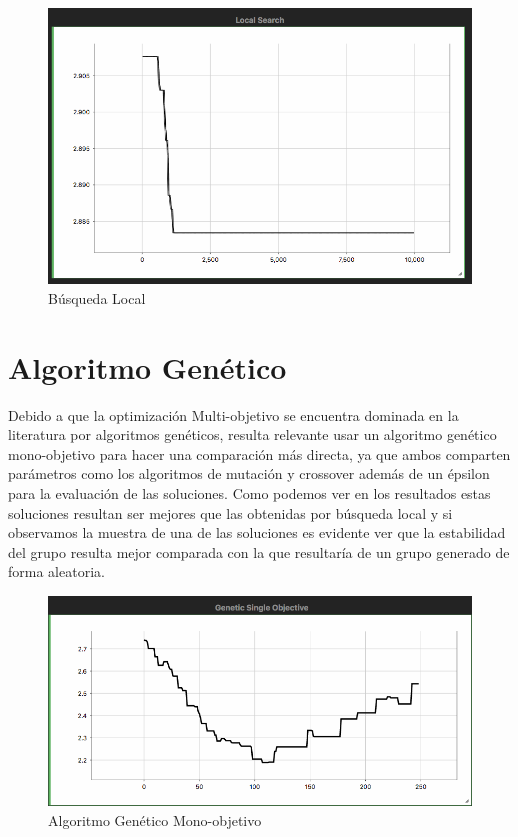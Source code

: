 \begin{figure}
    \centering
    \includegraphics[width=150mm]{Local.png}
    \caption{Búsqueda Local}
    \label{fig:local}
\end{figure}

\section{Algoritmo Genético}

Debido a que la optimización Multi-objetivo se encuentra dominada en la literatura por algoritmos genéticos, resulta relevante usar un algoritmo genético mono-objetivo para hacer una comparación más directa, ya que ambos comparten parámetros como los algoritmos de mutación y crossover además de un épsilon para la evaluación de las soluciones. Como podemos ver en los resultados estas soluciones resultan ser mejores que las obtenidas por búsqueda local y si observamos la muestra de una de las soluciones es evidente ver que la estabilidad del grupo resulta mejor comparada con la que resultaría de un grupo generado de forma aleatoria.

\begin{figure}
    \centering
    \includegraphics[width=150mm]{Genetic.png}
    \caption{Algoritmo Genético Mono-objetivo}
    \label{fig:genetico}
\end{figure}

